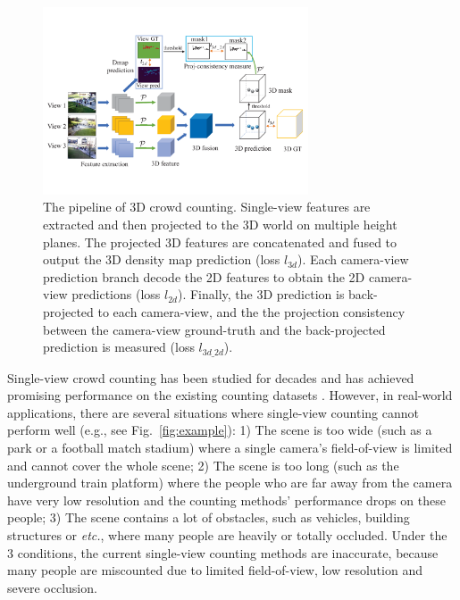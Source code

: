 \documentclass[letterpaper]{article}
\newcommand{\citep}{\cite}
\begin{document}
\begin{figure}[t]
\centering
   \includegraphics[width=0.7\textwidth]{Fig_pipeline.pdf}
   \caption{The pipeline of 3D crowd counting. Single-view features are extracted and then projected to the 3D world on multiple height planes. The projected 3D features are concatenated and fused to output the 3D density map prediction (loss $l_{3d}$). Each camera-view prediction branch decode the 2D features to obtain the 2D camera-view predictions (loss $l_{2d}$). Finally, the 3D prediction is back-projected to each camera-view, and the the projection consistency between the camera-view ground-truth and the back-projected prediction %
   is measured (loss $l_{3d\_2d}$).}
\label{fig:pipeline}
\end{figure}

Single-view crowd counting has been studied for decades and has achieved promising performance on the existing counting datasets \citep{zhang2015cross,Idrees2013Multi,zhang2016single,Chan2008Privacy,Chen2012Feature,idrees2018composition}. However, in real-world applications, there are several situations where single-view counting cannot perform well (e.g., see Fig.~\ref{fig:example}): 1) The scene is too wide (such as a park or a football match stadium) where a single camera's field-of-view is limited and cannot cover the whole scene; 2) The scene is too long (such as the underground train platform) where the people who are far away from the camera have very low resolution and the counting methods' performance drops on these people; 3) The scene contains a lot of obstacles, such as vehicles, building structures or \emph{etc.}, where many people are heavily or totally occluded. Under the 3 conditions, the current single-view counting methods are inaccurate, because many people are miscounted due to limited field-of-view, low resolution and severe occlusion.
\end{document}
